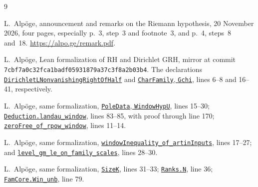 \documentclass[11pt]{article}
\theoremstyle{definition}
\theoremstyle{remark}
\begin{document}
\begin{thebibliography}{9}
\raggedright
{}
L.~Alp\"oge, announcement and remarks on the Riemann hypothesis,
20 November 2026, four pages, especially p.~3, step~3 and footnote~3,
and p.~4, steps~8 and~18.
\url{https://alpo.ge/remark.pdf}.

L.~Alp\"oge, Lean formalization of RH and Dirichlet GRH,
mirror at commit \texttt{7cbf7a0c32fca1badf05931879a37c3f8a2b03b4}.
The declarations
\href{https://github.com/CocoSgt/riemann-hypothesis-lean/blob/7cbf7a0c32fca1badf05931879a37c3f8a2b03b4/src/Statements.lean}{\texttt{DirichletLNonvanishingRightOfHalf}}
and
\href{https://github.com/CocoSgt/riemann-hypothesis-lean/blob/7cbf7a0c32fca1badf05931879a37c3f8a2b03b4/src/Development/AutomorphicArithmetic/DedekindLFunctions/CharFamily.lean}{\texttt{CharFamily}, \texttt{Gchi}},
lines 6--8 and 16--41, respectively.

L.~Alp\"oge, same formalization,
\href{https://github.com/CocoSgt/riemann-hypothesis-lean/blob/7cbf7a0c32fca1badf05931879a37c3f8a2b03b4/src/Development/AutomorphicArithmetic/DedekindLFunctions/LandauZeroFreeCriterion.lean}{\texttt{PoleData}, \texttt{WindowHypU}},
lines 15--30;
\href{https://github.com/CocoSgt/riemann-hypothesis-lean/blob/7cbf7a0c32fca1badf05931879a37c3f8a2b03b4/src/Development/AutomorphicArithmetic/DedekindLFunctions/LandauTheorems/landauWindow.lean}{\texttt{Deduction.landau\_window}},
lines 83--85, with proof through line 170;
\href{https://github.com/CocoSgt/riemann-hypothesis-lean/blob/7cbf7a0c32fca1badf05931879a37c3f8a2b03b4/src/Development/AutomorphicArithmetic/DedekindLFunctions/LandauTheorems/ZeroFreeOfRpowWindow.lean}{\texttt{zeroFree\_of\_rpow\_window}},
lines 11--14.

L.~Alp\"oge, same formalization,
\href{https://github.com/CocoSgt/riemann-hypothesis-lean/blob/7cbf7a0c32fca1badf05931879a37c3f8a2b03b4/src/Development/AutomorphicArithmetic/PrimitiveCosets/WindowInequalityOfArtinInputs.lean}{\texttt{windowInequality\_of\_artinInputs}},
lines 17--27; and
\href{https://github.com/CocoSgt/riemann-hypothesis-lean/blob/7cbf7a0c32fca1badf05931879a37c3f8a2b03b4/src/Development/AutomorphicArithmetic/PrimitiveCosets/LevelGmLeOnFamilyScales.lean}{\texttt{level\_gm\_le\_on\_family\_scales}},
lines 28--30.

L.~Alp\"oge, same formalization,
\href{https://github.com/CocoSgt/riemann-hypothesis-lean/blob/7cbf7a0c32fca1badf05931879a37c3f8a2b03b4/src/Formalism/SharpRestriction/ElevenLe.lean}{\texttt{SizeK}}, lines 31--33;
\href{https://github.com/CocoSgt/riemann-hypothesis-lean/blob/7cbf7a0c32fca1badf05931879a37c3f8a2b03b4/src/Formalism/LocalRingCardinality/Params.lean}{\texttt{Ranks.N}}, line 36;
\href{https://github.com/CocoSgt/riemann-hypothesis-lean/blob/7cbf7a0c32fca1badf05931879a37c3f8a2b03b4/src/Formalism/SharpRestriction/FamCore.lean}{\texttt{FamCore.Win\_unb}}, line 79.


\end{thebibliography}
\end{document}
